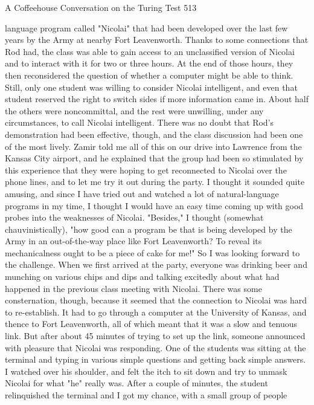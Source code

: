 A Coffeehouse Conversation on the Turing Test                                       513

language program called "Nicolai" that had been developed over the last few years by
the Army at nearby Fort Leavenworth. Thanks to some connections that Rod had, the
class was able to gain access to an unclassified version of Nicolai and to interact with
it for two or three hours. At the end of those hours, they then reconsidered the
question of whether a computer might be able to think. Still, only one student was
willing to consider Nicolai intelligent, and even that student reserved the right to
switch sides if more information came in. About half the others were noncommittal,
and the rest were unwilling, under any circumstances, to call Nicolai intelligent. There
was no doubt that Rod's demonstration had been effective, though, and the class
discussion had been one of the most lively.
        Zamir told me all of this on our drive into Lawrence from the Kansas City
airport, and he explained that the group had been so stimulated by this experience that
they were hoping to get reconnected to Nicolai over the phone lines, and to let me try
it out during the party. I thought it sounded quite amusing, and since I have tried out
and watched a lot of natural-language programs in my time, I thought I would have an
easy time coming up with good probes into the weaknesses of Nicolai. "Besides," I
thought (somewhat chauvinistically), "how good can a program be that is being
developed by the Army in an out-of-the-way place like Fort Leavenworth? To reveal
its mechanicalness ought to be a piece of cake for me!" So I was looking forward to
the challenge.
        When we first arrived at the party, everyone was drinking beer and munching
on various chips and dips and talking excitedly about what had happened in the
previous class meeting with Nicolai. There was some consternation, though, because
it seemed that the connection to Nicolai was hard to re-establish. It had to go through
a computer at the University of Kansas, and thence to Fort Leavenworth, all of which
meant that it was a slow and tenuous link. But after about 45 minutes of trying to set
up the link, someone announced with pleasure that Nicolai was responding. One of
the students was sitting at the terminal and typing in various simple questions and
getting back simple answers. I watched over his shoulder, and felt the itch to sit down
and try to unmask Nicolai for what "he" really was. After a couple of minutes, the
student relinquished the terminal and I got my chance, with a small group of people
